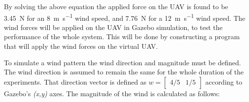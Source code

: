 \documentclass[conference]{IEEEtran}
\begin{document}
By solving the above equation the applied force on the UAV is found
to be \SI{3.45}{\newton} for an \SI{8}{\m \per \s} wind speed, and \SI{7.76}{\newton} for a \SI{12}{\m \per \s}
wind speed. The wind forces will be applied on the UAV in Gazebo
simulation, to test the performance of the whole system. This will be
done by constructing a program that will apply the wind forces on the
virtual UAV.

To simulate a wind pattern the wind direction and magnitude must be
defined. The wind direction is assumed to remain the same for the
whole duration of the experiments. That direction vector is defined as
$w=\begin{bmatrix}4/5 & 1/5\end{bmatrix}$ according to Gazebo's \emph{(x,y)} axes.
%
The magnitude of the wind is calculated as follows: %
\end{document}
